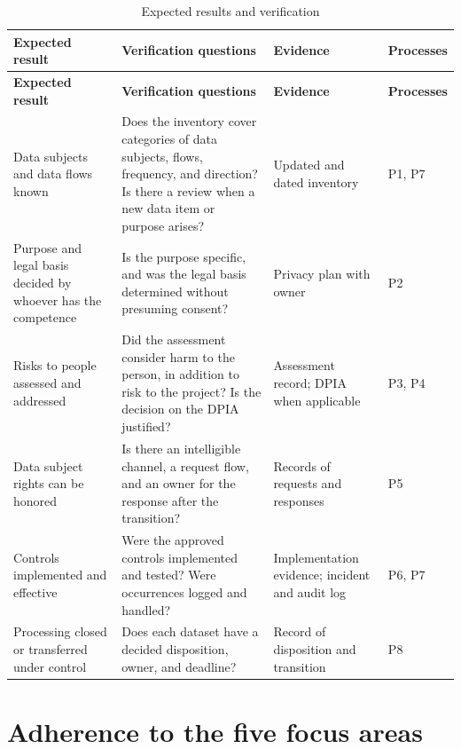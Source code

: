 \documentclass[11pt,a4paper]{article}
\makeatletter
\newcommand{\refnum}[1]{\csname refnum@#1\endcsname}
\newcommand{\cit}[1]{[\refnum{#1}]}
\newcommand{\SingleSpacing}{}
\newcommand{\fontetab}[1]{\par\vspace{3pt}{\small\noindent Source: #1\par}}
\makeatother
\begin{document}
\begingroup\SingleSpacing\footnotesize
\begin{longtable}{@{}>{\raggedright\arraybackslash}p{}>{\raggedright\arraybackslash}p{}>{\raggedright\arraybackslash}p{}>{\raggedright\arraybackslash}p{}@{}}
\caption{Expected results and verification}\label{tab:t7}\\
\toprule
\textbf{Expected result} & \textbf{Verification questions} & \textbf{Evidence} & \textbf{Processes}\\
\midrule
\endfirsthead
\toprule
\textbf{Expected result} & \textbf{Verification questions} & \textbf{Evidence} & \textbf{Processes}\\
\midrule
\endhead
\bottomrule
\endfoot
\bottomrule
\endlastfoot
Data subjects and data flows known & Does the inventory cover categories of data subjects, flows, frequency, and direction? Is there a review when a new data item or purpose arises? & Updated and dated inventory & P1, P7\\[3pt]
Purpose and legal basis decided by whoever has the competence & Is the purpose specific, and was the legal basis determined without presuming consent? & Privacy plan with owner & P2\\[3pt]
Risks to people assessed and addressed & Did the assessment consider harm to the person, in addition to risk to the project? Is the decision on the DPIA justified? & Assessment record; DPIA when applicable & P3, P4\\[3pt]
Data subject rights can be honored & Is there an intelligible channel, a request flow, and an owner for the response after the transition? & Records of requests and responses & P5\\[3pt]
Controls implemented and effective & Were the approved controls implemented and tested? Were occurrences logged and handled? & Implementation evidence; incident and audit log & P6, P7\\[3pt]
Processing closed or transferred under control & Does each dataset have a decided disposition, owner, and deadline? & Record of disposition and transition & P8\\[3pt]
\end{longtable}
\endgroup
\fontetab{Prepared by the authors (2026), based on \cit{pmi}.}

\section{Adherence to the five focus areas}
\end{document}
